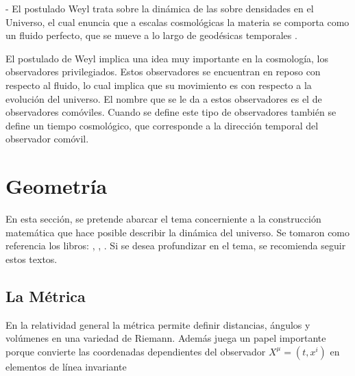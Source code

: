 - El postulado Weyl trata sobre la dinámica de las sobre densidades en el Universo, el cual enuncia que a escalas cosmológicas la materia se comporta como un fluido perfecto, que se mueve a lo largo de geodésicas temporales \cite{janssen2013}. %


El postulado de Weyl implica una idea muy importante en la cosmología, los observadores privilegiados. Estos observadores  se encuentran en reposo con respecto al fluido, lo cual implica que su movimiento es con respecto a la evolución del universo. El nombre que se le da a estos observadores es el de  observadores comóviles. Cuando se define este tipo de observadores también se define un tiempo cosmológico, que corresponde a la dirección temporal del observador comóvil. 



\section{Geometría}
\label{sec:Geometría}
En esta sección, se pretende abarcar el tema concerniente a la construcción matemática que hace posible describir la dinámica del universo. Se tomaron como referencia los libros: \cite{janssen2013}, \cite{longair2008}, \cite{baumann}. Si se desea profundizar en el tema, se recomienda seguir estos textos.
	\subsection{La Métrica}
	\label{subsec:Metrica}
	
En la relatividad general la métrica permite definir distancias, ángulos y volúmenes en una variedad de Riemann. Además juega un papel importante porque convierte las coordenadas dependientes del observador $X^{\mu}=(t,x^{i})$ en elementos de línea invariante


